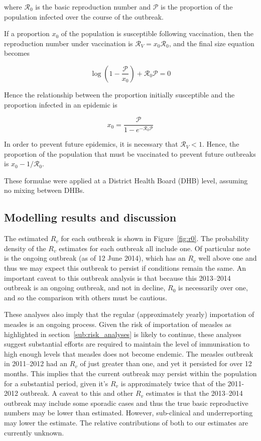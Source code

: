 \documentclass{article}
\newcommand{\Pe}{\mathcal{P}}
\newcommand{\Ro}{\mathcal{R}_0}
\newcommand{\Rr}{\mathcal{R}}
\begin{document}
where $\Ro$ is the basic reproduction number and $\Pe$ is the proportion of the population infected over the course of the outbreak.

If a proportion $x_0$ of the population is susceptible following vaccination, then the  reproduction number under vaccination is $\Rr_V=x_0\Ro$, and the final size equation becomes

\begin{equation} \label{eq:eqn2}
\log\left(1-\frac{\Pe}{x_0}\right)+\Ro\Pe=0
\end{equation}

Hence the relationship between the proportion initially susceptible and the proportion infected in an epidemic is

\begin{equation} \label{eq:eqn3}
x_0=\frac{\Pe}{1-e^{-\Ro\Pe}}
\end{equation}

In order to prevent future epidemics, it is necessary that $\Rr_V<1$. Hence, the proportion of the population that must be vaccinated to prevent future outbreaks is $x_0-1/\Ro$.

These formulae were applied at a District Health Board (DHB) level, assuming no mixing between DHBs.

\subsection{Modelling results and discussion}

The estimated $R_v$ for each outbreak is shown in Figure~\ref{fig:r0}. The probability density of the $R_v$ estimates for each outbreak all include one. Of particular note is the ongoing outbreak (as of 12 June 2014), which has an $R_v$ well above one and thus we may expect this outbreak to persist if conditions remain the same. An important caveat to this outbreak analysis is that because this 2013--2014 outbreak is an ongoing outbreak, and not in decline, $R_0$ is necessarily over one, and so the comparison with others must be cautious.

These analyses also imply that the regular (approximately yearly) importation of measles is an ongoing process. Given the risk of importation of measles as highlighted in section~\ref{sub:risk_analyses} is likely to continue, these analyses suggest substantial efforts are required to maintain the level of immunisation to high enough levels that measles does not become endemic. The measles outbreak in 2011--2012 had an $R_v$ of just greater than one, and yet it persisted for over 12 months. This implies that the current outbreak may persist within the population for a substantial period, given it's $R_v$ is approximately twice that of the 2011-2012 outbreak. A caveat to this and other $R_v$ estimates is that the 2013--2014 outbreak may include some sporadic cases and thus the true basic reproductive numbers may be lower than estimated. However, sub-clinical and underreporting may lower the estimate. The relative contributions of both to our estimates are currently unknown.
\end{document}
